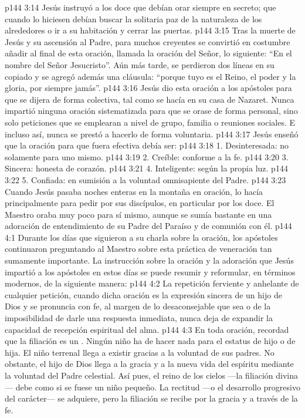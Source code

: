 \vs p144 3:14 Jesús instruyó a los doce que debían orar siempre en secreto; que cuando lo hiciesen debían buscar la solitaria paz de la naturaleza de los alrededores o ir a su habitación y cerrar las puertas.
\vs p144 3:15 Tras la muerte de Jesús y su ascensión al Padre, para muchos creyentes se convirtió en costumbre añadir al final de esta oración, llamada la oración del Señor, lo siguiente: “En el nombre del Señor Jesucristo”. Aún más tarde, se perdieron dos líneas en su copiado y se agregó además una cláusula: “porque tuyo es el Reino, el poder y la gloria, por siempre jamás”.
\vs p144 3:16 Jesús dio esta oración a los apóstoles para que se dijera de forma colectiva, tal como se hacía en su casa de Nazaret. Nunca impartió ninguna oración sistematizada para que se orase de forma personal, sino solo peticiones que se emplearan a nivel de grupo, familia o reuniones sociales. E incluso así, nunca se prestó a hacerlo de forma voluntaria.
\vs p144 3:17 Jesús enseñó que la oración para que fuera efectiva debía ser:
\vs p144 3:18 1. Desinteresada: no solamente para uno mismo.
\vs p144 3:19 2. Creíble: conforme a la fe.
\vs p144 3:20 3. Sincera: honesta de corazón.
\vs p144 3:21 4. Inteligente: según la propia luz.
\vs p144 3:22 5. Confiada: en sumisión a la voluntad omnisapiente del Padre.
\vs p144 3:23 Cuando Jesús pasaba noches enteras en la montaña en oración, lo hacía principalmente para pedir por sus discípulos, en particular por los doce. El Maestro oraba muy poco para sí mismo, aunque se sumía bastante en una adoración de entendimiento de su Padre del Paraíso y de comunión con él.
\vs p144 4:1 Durante los días que siguieron a su charla sobre la oración, los apóstoles continuaron preguntando al Maestro sobre esta práctica de veneración tan sumamente importante. La instrucción sobre la oración y la adoración que Jesús impartió a los apóstoles en estos días se puede resumir y reformular, en términos modernos, de la siguiente manera:
\vs p144 4:2 La repetición ferviente y anhelante de cualquier petición, cuando dicha oración es la expresión sincera de un hijo de Dios y se pronuncia con fe, al margen de lo desaconsejable que sea o de la imposibilidad de darle una respuesta inmediata, nunca deja de expandir la capacidad de recepción espiritual del alma.
\vs p144 4:3 En toda oración, recordad que la filiación es un . Ningún niño ha de hacer nada para  el estatus de hijo o de hija. El niño terrenal llega a existir gracias a la voluntad de sus padres. No obstante, el hijo de Dios llega a la gracia y a la nueva vida del espíritu mediante la voluntad del Padre celestial. Así pues, el reino de los cielos ---la filiación divina--- debe  como si se fuese un niño pequeño. La rectitud ---o el desarrollo progresivo del carácter--- se adquiere, pero la filiación se recibe por la gracia y a través de la fe.
